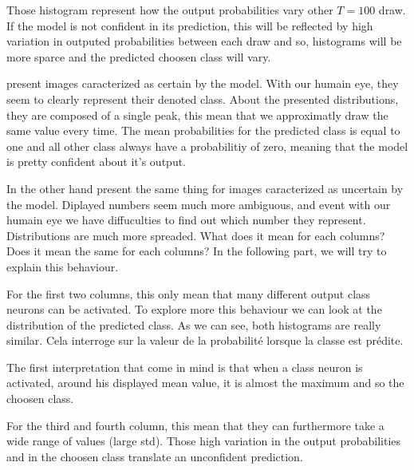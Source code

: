 Those histogram represent how the output probabilities vary other $ T=100 $ draw. If the model is not confident in its prediction, this will be reflected by high variation in outputed probabilities between each draw and so, histograms will be more sparce and the predicted choosen class will vary.

 present images caracterized as certain by the model. With our humain eye, they seem to clearly represent their denoted class. About the presented distributions, they are composed of a single peak, this mean that we approximatly draw the same value every time. The mean probabilities for the predicted class is equal to one and all other class always have a probabilitiy of zero, meaning that the model is pretty confident about it's output. 

In the other hand  present the same thing for images caracterized as uncertain by the model. Diplayed numbers seem much more ambiguous, and event with our humain eye we have diffuculties to find out which number they represent. 
Distributions are much more spreaded. What does it mean for each columns?Does it mean the same for each columns? In the following part, we will try to explain this behaviour.

For the first two columns, this only mean that many different output class neurons can be activated. To explore more this behaviour we can look at the distribution of the predicted class. As we can see, both histograms are really similar. Cela interroge sur la valeur de la probabilité lorsque la classe est prédite.

The first interpretation that come in mind is that when a class neuron is activated, around his displayed mean value, it is almost the maximum and so the choosen class. 

For the third and fourth column, this mean that they can furthermore take a wide range of values (large std). Those high variation in the output probabilities and in the choosen class translate an unconfident prediction. 

